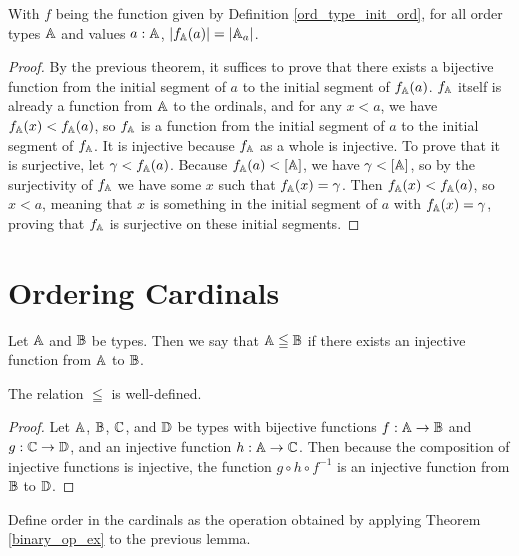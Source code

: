 \documentclass[../../math.tex]{subfiles}
\begin{document}
\begin{theorem} \label{ord_to_card_init}
    With $f$ being the function given by Definition \ref{ord_type_init_ord}, for
    all order types $\mathbb{A}$ and values $a : \mathbb{A}$, $|f_{\mathbb{A}}(a)| = |\mathbb{A}_a|$.
\end{theorem}
\begin{proof}
    By the previous theorem, it suffices to prove that there exists a bijective
    function from the initial segment of $a$ to the initial segment of
    $f_{\mathbb{A}}(a)$.  $f_{\mathbb{A}}$ itself is already a function from $\mathbb{A}$ to the ordinals,
    and for any $x < a$, we have $f_{\mathbb{A}}(x) < f_{\mathbb{A}}(a)$, so $f_{\mathbb{A}}$ is a function
    from the initial segment of $a$ to the initial segment of $f_{\mathbb{A}}$.  It is
    injective because $f_{\mathbb{A}}$ as a whole is injective.  To prove that it is
    surjective, let $\gamma < f_{\mathbb{A}}(a)$.  Because $f_{\mathbb{A}}(a) < [\mathbb{A}]$, we have
    $\gamma < [\mathbb{A}]$, so by the surjectivity of $f_{\mathbb{A}}$ we have some $x$ such that
    $f_{\mathbb{A}}(x) = \gamma$.  Then $f_{\mathbb{A}}(x) < f_{\mathbb{A}}(a)$, so $x < a$, meaning that $x$
    is something in the initial segment of $a$ with $f_{\mathbb{A}}(x) = \gamma$, proving
    that $f_{\mathbb{A}}$ is surjective on these initial segments.
\end{proof}

\section{Ordering Cardinals}

\begin{definition}
    Let $\mathbb{A}$ and $\mathbb{B}$ be types.  Then we say that $\mathbb{A} \leqq \mathbb{B}$ if there exists
    an injective function from $\mathbb{A}$ to $\mathbb{B}$.
\end{definition}

\begin{lemma}
    The relation $\leqq$ is well-defined.
\end{lemma}
\begin{proof}
    Let $\mathbb{A}$, $\mathbb{B}$, $\mathbb{C}$, and $\mathbb{D}$ be types with bijective functions $f : \mathbb{A} \to
    \mathbb{B}$ and $g : \mathbb{C} \to \mathbb{D}$, and an injective function $h : \mathbb{A} \to \mathbb{C}$.  Then
    because the composition of injective functions is injective, the function $g
    \circ h \circ f^{-1}$ is an injective function from $\mathbb{B}$ to $\mathbb{D}$.
\end{proof}

\begin{instance}
    Define order in the cardinals as the operation obtained by applying Theorem
    \ref{binary_op_ex} to the previous lemma.
\end{instance}
\end{document}

